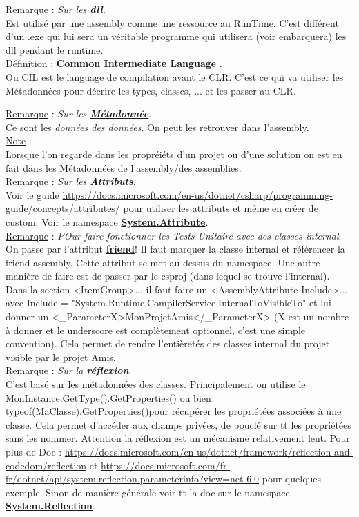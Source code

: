 \documentclass[a4paper,12pt,twoside]{article}
\newcommand{\urlcolor}{magenta}  %
\newcommand{\keycolor}{purple} %
\newcommand{\incode}[1]{{\footnotesize\ttfamily #1}} %
\newcommand{\rem}[2]{\noindent\underline{Remarque} : \textit{#1}.\\ \indent #2}
\newcommand{\note}[1]{\noindent\underline{Note} : \\ \indent #1}
\newcommand{\defi}[2]{\noindent\underline{Définition} : \textbf{#1}.\\ \indent #2}
\newcommand{\keyref}[2]{\hypersetup{urlcolor=\keycolor} \href{#1}{\textbf{#2}}\hypersetup{urlcolor=\urlcolor}}
\begin{document}
\rem{Sur les \keyref{https://fr.wikipedia.org/wiki/Dynamic_Link_Library}{dll}}{Est utilisé par une assembly comme une ressource au RunTime. C'est différent d'un .exe qui lui sera un véritable programme qui utilisera (voir embarquera) les dll pendant le runtime.}\\

\defi{Common Intermediate Language }{Ou CIL est le language de compilation avant le CLR. C'est ce qui va utiliser les Métadonnées pour décrire les types, classes, ... et les passer au CLR.}

\rem{Sur les \keyref{https://docs.microsoft.com/en-us/dotnet/standard/metadata-and-self-describing-components}{Métadonnée}}{Ce sont les \textit{données des données}. On peut les retrouver dans l'assembly.}\\

\note{Lorsque l'on regarde dans les propréiéts d'un projet ou d'une solution on est en fait dans les Métadonnées de l'assembly/des assemblies.}\\


\rem{Sur les \keyref{https://docs.microsoft.com/en-us/dotnet/standard/attributes/}{Attributs}}{Voir le guide \url{https://docs.microsoft.com/en-us/dotnet/csharp/programming-guide/concepts/attributes/} pour utiliser les attributs et même en créer de custom. Voir le namespace \keyref{https://docs.microsoft.com/en-us/dotnet/api/system.attribute?view=net-6.0}{System.Attribute}.}\\

\rem{POur faire fonctionner les Tests Unitaire avec des classes internal}{On passe par l'attribut \keyref{https://docs.microsoft.com/fr-fr/dotnet/standard/assembly/friend}{friend}! Il faut marquer la classe internal et référencer la friend assembly. Cette attribut se met au dessus du namespace. Une autre manière de faire est de passer par le csproj (dans lequel se trouve l'internal). Dans la section <ItemGroup>... il faut faire un <AssemblyAttribute Include>... avec Include = "System.Runtime.CompilerService.InternalToVisibleTo" et lui donner un <\_ParameterX>MonProjetAmis</\_ParameterX> (X est un nombre à donner et le underscore est complètement optionnel, c'est une simple convention). Cela permet de rendre l'entièretés des classes internal du projet visible par le projet Amis.}\\

\rem{Sur la \keyref{https://docs.microsoft.com/en-us/dotnet/csharp/programming-guide/concepts/reflection}{réflexion}}{C'est basé sur les métadonnées des classes. Principalement on utilise le \incode{MonInstance.GetType().GetProperties()} ou bien \incode{typeof(MaClasse).GetProperties()}pour récupérer les propriétées associées à une classe. Cela permet d'accéder aux champs privées, de bouclé sur tt les propriétées sans les nommer. Attention la réflexion est un mécanisme relativement lent. Pour plus de Doc : \url{https://docs.microsoft.com/en-us/dotnet/framework/reflection-and-codedom/reflection} et \url{https://docs.microsoft.com/fr-fr/dotnet/api/system.reflection.parameterinfo?view=net-6.0} pour quelques exemple. Sinon de manière générale voir tt la doc sur le namespace \keyref{https://docs.microsoft.com/fr-fr/dotnet/api/system.reflection?view=net-6.0}{System.Reflection}.}\\
\end{document}
